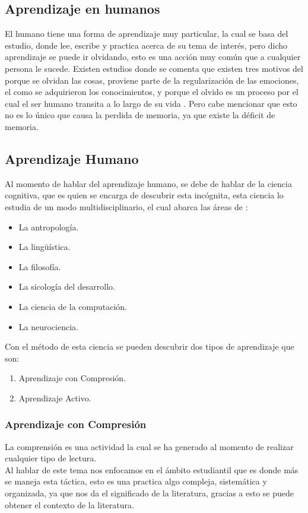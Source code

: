\subsection {Aprendizaje en humanos}
        El humano tiene una forma de aprendizaje muy particular, la cual se basa del estudio, donde lee, escribe y practica acerca de
        su tema de interés, pero dicho aprendizaje se puede ir olvidando, esto es una acción muy común que a cualquier persona le sucede.
        Existen estudios donde se comenta que existen tres motivos del porque se olvidan las cosas, proviene parte de la regularización de las emociones,
        el como se adquirieron los conocimientos, y porque el olvido es un proceso por el cual el ser humano transita a lo largo de su vida \cite{Nrby2015}. Pero cabe
        mencionar que esto no es lo único que causa la perdida de memoria, ya que existe la déficit de memoria. 

    \subsection{Aprendizaje Humano}
        Al momento de hablar del aprendizaje humano, se debe de hablar de la ciencia cognitiva, que es quien se encarga de descubrir esta incógnita,
        esta ciencia lo estudia de un modo multidisciplinario, el cual abarca las \'areas de \cite{bransford2000}: 
        \begin{itemize}
            \item La antropología.
            \item La lingüística.
            \item La filosofía.
            \item La sicología del desarrollo.
            \item La ciencia de la computación. 
            \item La neurociencia.
        \end{itemize}
        Con el método de esta ciencia se pueden descubrir dos tipos de aprendizaje que son:
        \begin{enumerate}
            \item Aprendizaje con Compresi\'on.
            \item Aprendizaje Activo.
        \end{enumerate}
        \subsubsection{Aprendizaje con Compresi\'on}
            La comprensi\'on es una actividad la cual se ha generado al momento de realizar cualquier tipo de lectura.\\
            Al hablar de este tema nos enfocamos en el \'ambito estudiantil que es donde m\'as se maneja esta t\'actica, esto es una
            practica algo compleja, sistemática y organizada, ya que nos da el significado de la literatura, gracias a esto se puede
            obtener el contexto de la literatura.


